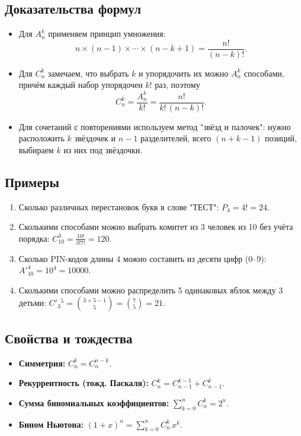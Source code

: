 \subsection{Доказательства формул}
\begin{itemize}
	\item Для $A_n^k$ применяем принцип умножения:
	$$n\times(n-1)\times\cdots\times(n-k+1)=\frac{n!}{(n-k)!}.$$ 
	\item Для $C_n^k$ замечаем, что выбрать $k$ и упорядочить их можно $A_n^k$ способами, причём каждый набор упорядочен $k!$ раз, поэтому
	$$C_n^k=\frac{A_n^k}{k!}=\frac{n!}{k!\,(n-k)!}.$$
	\item Для сочетаний с повторениями используем метод "звёзд и палочек": нужно расположить $k$ звёздочек и $n-1$ разделителей, всего $(n+k-1)$ позиций, выбираем $k$ из них под звёздочки.
\end{itemize}

\subsection{Примеры}
\begin{enumerate}
	\item Сколько различных перестановок букв в слове "ТЕСТ": $P_4=4!=24$.
	\item Сколькими способами можно выбрать комитет из 3 человек из 10 без учёта порядка: $C_{10}^3=\frac{10!}{3!7!}=120$.
	\item Сколько PIN-кодов длины 4 можно составить из десяти цифр (0--9): ${A'}_{10}^4=10^4=10000$.
	\item Сколькими способами можно распределить 5 одинаковых яблок между 3 детьми: $C'_{3}{}^5=\binom{3+5-1}{5}=\binom{7}{5}=21$.
\end{enumerate}

\subsection{Свойства и тождества}
\begin{itemize}
	\item \textbf{Симметрия:} $\displaystyle C_n^k = C_n^{n-k}.$
	\item \textbf{Рекуррентность (тожд. Паскаля):} $\displaystyle C_n^k = C_{n-1}^{k-1} + C_{n-1}^k.$
	\item \textbf{Сумма биномиальных коэффициентов:} $\displaystyle \sum_{k=0}^n C_n^k = 2^n.$
	\item \textbf{Бином Ньютона:} $(1 + x)^n = \sum_{k=0}^n C_n^k \,x^k.$
\end{itemize}

